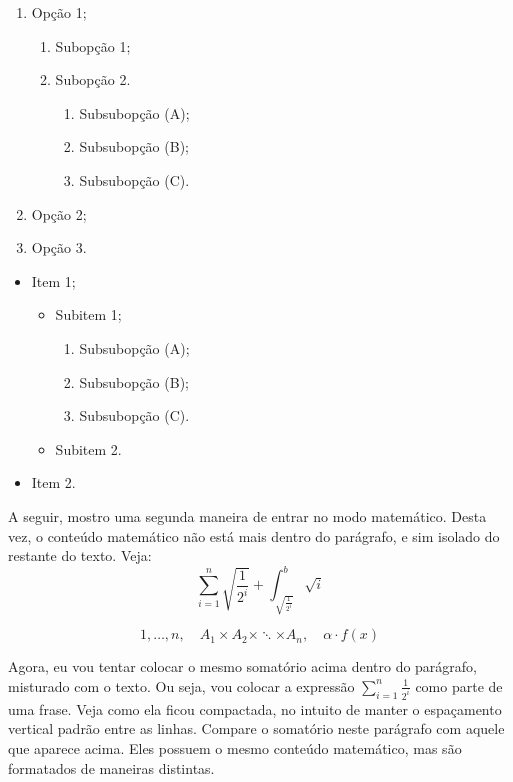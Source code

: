 \documentclass{article}
\begin{document}
\begin{enumerate}
    \item Opção 1;
    \begin{enumerate}
        \item Subopção 1;
        \item Subopção 2.
        \begin{enumerate}
            \item Subsubopção (A);
            \item Subsubopção (B);
            \item Subsubopção (C).
        \end{enumerate}
    \end{enumerate}
    \item Opção 2;
    \item Opção 3.
\end{enumerate}

\begin{itemize}
    \item Item 1;
    \begin{itemize}
        \item Subitem 1;
        \begin{enumerate}
            \item Subsubopção (A);
            \item Subsubopção (B);
            \item Subsubopção (C).
        \end{enumerate}
        \item Subitem 2.
    \end{itemize}
    \item Item 2.
\end{itemize}

A seguir, mostro uma segunda maneira de entrar no modo matemático. Desta vez, o conteúdo matemático não está mais dentro do parágrafo, e sim isolado do restante do texto. Veja:
\[
\sum_{i=1}^{n} \sqrt{\frac{ 1 }{ 2^i }} + \int_{\sqrt{\frac{ 1 }{ 2^i }}}^{b} \sqrt{i}
\]

\[
1,\ldots,n, \quad A_1 \times A_2 \times \ddots \times A_n, \quad \alpha \cdot f(x)
\]

Agora, eu vou tentar colocar o mesmo somatório acima dentro do parágrafo, misturado com o texto. Ou seja, vou colocar a expressão $\sum_{i=1}^{n} \frac{1}{2^i}$ como parte de uma frase. Veja como ela ficou compactada, no intuito de manter o espaçamento vertical padrão entre as linhas. Compare o somatório neste parágrafo com aquele que aparece acima. Eles possuem o mesmo conteúdo matemático, mas são formatados de maneiras distintas.\\
\end{document}
